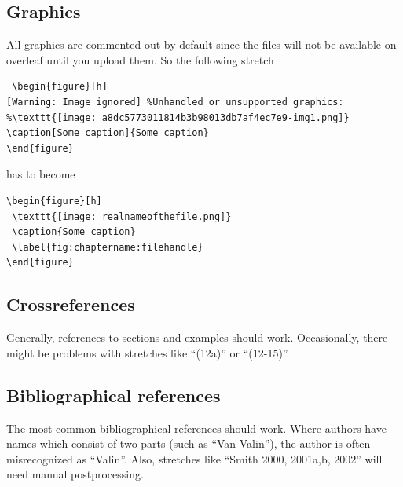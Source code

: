 \subsection{Graphics}
All graphics are commented out by default since the files will not be available on overleaf until you upload them. So the following stretch

\begin{verbatim}
 \begin{figure}[h]
[Warning: Image ignored] %Unhandled or unsupported graphics:
%\texttt{[image: a8dc5773011814b3b98013db7af4ec7e9-img1.png]}
\caption[Some caption]{Some caption}
\end{figure}
\end{verbatim}

has to become


\begin{verbatim}
\begin{figure}[h]
 \texttt{[image: realnameofthefile.png]}
 \caption{Some caption}
 \label{fig:chaptername:filehandle}
\end{figure}
\end{verbatim}

\subsection{Crossreferences}
Generally, references to sections and examples should work. Occasionally, there might be problems with stretches like ``(12a)'' or ``(12-15)''.

\subsection{Bibliographical references}
The most common bibliographical references should work. Where authors have names which consist of two parts (such as ``Van Valin''), the author is often misrecognized as ``Valin''. Also, stretches like ``Smith 2000, 2001a,b, 2002'' will need manual postprocessing. 





